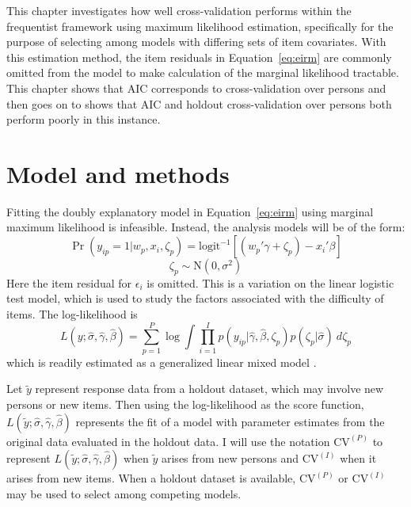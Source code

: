 This chapter investigates how well cross-validation performs within the frequentist framework using maximum likelihood estimation, specifically for the purpose of selecting among models with differing sets of item covariates. With this estimation method, the item residuals in Equation~\ref{eq:eirm} are commonly omitted from the model to make calculation of the marginal likelihood tractable. This chapter shows that AIC \parencite{akaike1974new} corresponds to cross-validation over persons and then goes on to shows that AIC and holdout cross-validation over persons both perform poorly in this instance.

\section{Model and methods}

Fitting the doubly explanatory model in Equation~\ref{eq:eirm} using marginal maximum likelihood is infeasible. Instead, the analysis models will be of the form:
\begin{equation} \label{eq:latent-reg-lltm}
	\Pr(y_{ip} = 1 | w_p, x_i, \zeta_p) =
	\mathrm{logit}^{-1} \left [ (w_p'\gamma + \zeta_p) - x_i'\beta \right ]
\end{equation}
\begin{equation}
	\zeta_p \sim \mathrm{N}(0, \sigma^2)
\end{equation}
Here the item residual for $\epsilon_i$ is omitted. This is a variation on the linear logistic test model, which is used to study the factors associated with the difficulty of items. The log-likelihood is
\begin{equation} \label{eq:lltm-likelihood}
	L(y ; \hat \sigma, \hat \gamma, \hat \beta) = 
	\sum_{p=1}^P \log
	\int \prod_{i=1}^I
		p(y_{ip} | \hat \gamma, \hat \beta, \zeta_p)
		p(\zeta_p | \hat \sigma)
	~d \zeta_p
\end{equation}
which is readily estimated as a generalized linear mixed model \parencite{Rijmen2003}.

Let $\tilde y$ represent response data from a holdout dataset, which may involve new persons or new items.
Then using the log-likelihood as the score function, $L(\tilde y ; \hat \sigma, \hat \gamma, \hat \beta)$ represents the fit of a model with parameter estimates from the original data evaluated in the holdout data. I will use the notation $\mathrm{CV}^{(P)}$ to represent $L(\tilde y ; \hat \sigma, \hat \gamma, \hat \beta)$ when $\tilde y$ arises from new persons and $\mathrm{CV}^{(I)}$ when it arises from new items. When a holdout dataset is available, $\mathrm{CV}^{(P)}$ or $\mathrm{CV}^{(I)}$ may be used to select among competing models.

